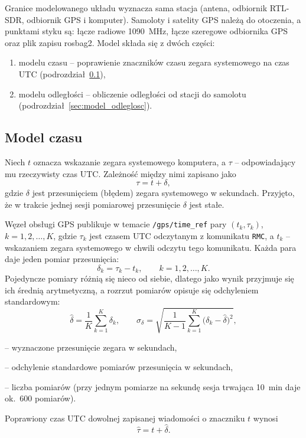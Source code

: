 Granice modelowanego układu wyznacza sama stacja (antena, odbiornik RTL-SDR,
odbiornik GPS i komputer). Samoloty i satelity GPS należą do otoczenia,
a punktami styku są: łącze radiowe \SI{1090}{MHz}, łącze szeregowe
odbiornika GPS oraz plik zapisu rosbag2. Model składa się z dwóch części:
\begin{enumerate}[nosep]
  \item modelu czasu -- poprawienie znaczników czasu zegara systemowego
        na czas UTC (podrozdział~\ref{sec:model_czasu}),
  \item modelu odległości -- obliczenie odległości od stacji do samolotu
        (podrozdział~\ref{sec:model_odleglosc}).
\end{enumerate}

\subsection{Model czasu}
\label{sec:model_czasu}

Niech $t$ oznacza wskazanie zegara systemowego komputera, a $\tau$ --
odpowiadający mu rzeczywisty czas UTC. Zależność między nimi zapisano jako
\begin{equation}
  \tau = t + \delta,
  \label{eq:model_zegara}
\end{equation}
gdzie $\delta$ jest przesunięciem (błędem) zegara systemowego w sekundach.
Przyjęto, że w trakcie jednej sesji pomiarowej przesunięcie $\delta$ jest
stałe.

Węzeł obsługi GPS publikuje w temacie \texttt{/gps/time\_ref} pary
$(t_k, \tau_k)$, $k = 1, 2, \ldots, K$, gdzie $\tau_k$ jest czasem UTC
odczytanym z komunikatu \texttt{RMC}, a $t_k$ -- wskazaniem zegara
systemowego w chwili odczytu tego komunikatu. Każda para daje jeden pomiar
przesunięcia:
\begin{equation}
  \delta_k = \tau_k - t_k, \qquad k = 1, 2, \ldots, K.
  \label{eq:offset_pomiar}
\end{equation}
Pojedyncze pomiary różnią się nieco od siebie, dlatego jako wynik przyjmuje
się ich średnią arytmetyczną, a rozrzut pomiarów opisuje się odchyleniem
standardowym:
\begin{equation}
  \hat{\delta} = \frac{1}{K} \sum_{k=1}^{K} \delta_k,
  \qquad
  \sigma_{\delta} = \sqrt{\frac{1}{K-1} \sum_{k=1}^{K}
                    \bigl(\delta_k - \hat{\delta}\bigr)^2},
  \label{eq:offset_srednia}
\end{equation}
\begin{objasnienia}
  \item[$\hat{\delta}$] -- wyznaczone przesunięcie zegara w sekundach,
  \item[$\sigma_{\delta}$] -- odchylenie standardowe pomiarów przesunięcia w sekundach,
  \item[$K$] -- liczba pomiarów (przy jednym pomiarze na sekundę sesja trwająca \SI{10}{min} daje ok.~600 pomiarów).
\end{objasnienia}
Poprawiony czas UTC dowolnej zapisanej wiadomości o znaczniku $t$ wynosi
\begin{equation}
  \hat{\tau} = t + \hat{\delta}.
  \label{eq:korekta_czasu}
\end{equation}


